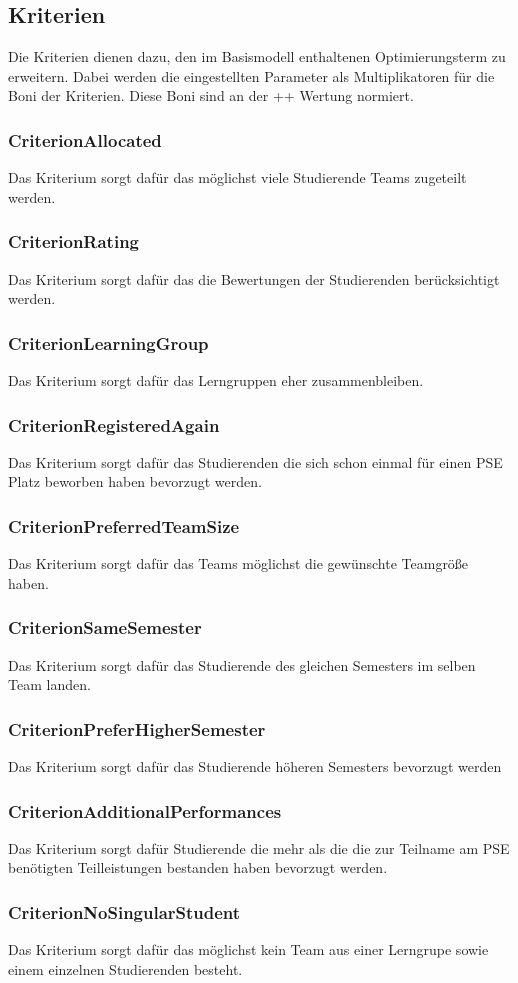 \documentclass[parskip=full]{scrartcl}
\begin{document}
\subsection{Kriterien}
Die Kriterien dienen dazu, den im Basismodell enthaltenen Optimierungsterm zu
erweitern. Dabei werden die eingestellten Parameter als Multiplikatoren für
die Boni der Kriterien. Diese Boni sind an der ++ Wertung normiert.

\subsubsection{CriterionAllocated}
Das Kriterium sorgt dafür das möglichst viele Studierende Teams zugeteilt
werden. 
\subsubsection{CriterionRating}
Das Kriterium sorgt dafür das die Bewertungen der Studierenden berücksichtigt
werden.
\subsubsection{CriterionLearningGroup}
Das Kriterium sorgt dafür das Lerngruppen eher zusammenbleiben.
\subsubsection{CriterionRegisteredAgain}
Das Kriterium sorgt dafür das Studierenden die sich schon einmal für einen PSE
Platz beworben haben bevorzugt werden.
\subsubsection{CriterionPreferredTeamSize}
Das Kriterium sorgt dafür das Teams möglichst die gewünschte Teamgröße haben.
\subsubsection{CriterionSameSemester}
Das Kriterium sorgt dafür das Studierende des gleichen Semesters im selben Team
landen.
\subsubsection{CriterionPreferHigherSemester}
Das Kriterium sorgt dafür das Studierende höheren Semesters bevorzugt werden
\subsubsection{CriterionAdditionalPerformances}
Das Kriterium sorgt dafür Studierende die mehr als die die zur Teilname am PSE
benötigten Teilleistungen bestanden haben bevorzugt werden.
\subsubsection{CriterionNoSingularStudent}
Das Kriterium sorgt dafür das möglichst kein Team aus einer Lerngrupe sowie
einem einzelnen Studierenden besteht.
\end{document}
